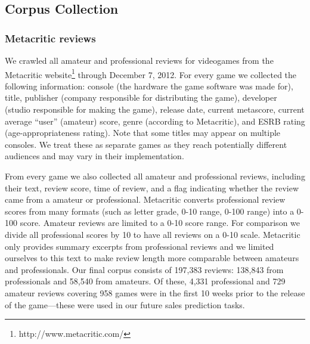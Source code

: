 \documentclass[letterpaper]{article}
\begin{document}
\subsection{Corpus Collection}
\subsubsection{Metacritic reviews}
We crawled all amateur and professional reviews for videogames from the Metacritic website\footnote{http://www.metacritic.com/} through December 7, 2012. 
For every game we collected the following information: console (the hardware the game software was made for), title, publisher (company responsible for distributing the game), developer (studio responsible for making the game), release date, current metascore, current average ``user'' (amateur) score, genre (according to Metacritic), and ESRB rating (age-appropriateness rating). Note that some titles may appear on multiple consoles. We treat these as separate games as they reach potentially different audiences and may vary in their implementation. 

From every game we also collected all amateur and professional reviews, including their text, review score, time of review, and a flag indicating whether the review came from a amateur or professional. Metacritic converts professional review scores from many formats (such as letter grade, 0-10 range, 0-100 range) into a 0-100 score. Amateur reviews are limited to a 0-10 score range. For comparison we divide all professional scores by 10 to have all reviews on a 0-10 scale. Metacritic only provides summary excerpts from professional reviews and we limited ourselves to this text to make review length more comparable between amateurs and professionals. Our final corpus consists of 197,383 reviews: 138,843 from professionals and 58,540 from amateurs. Of these, 4,331 professional and 729 amateur reviews covering 958 games were in the first 10 weeks prior to the release of the game---these were used in our future sales prediction tasks.
\end{document}
